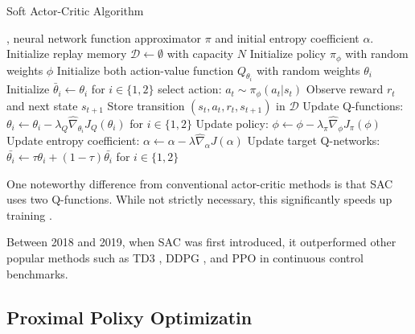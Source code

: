 \begin{algorithm}[H]
\caption{Soft Actor-Critic Algorithm}
\label{alg:SAC}
\begin{algorithmic}[1]
, neural network function approximator $\pi$ and initial entropy coefficient $\alpha$.
\State Initialize replay memory $\mathcal{D} \leftarrow \emptyset$ with capacity $N$
\State Initialize policy $\pi_{\phi}$ with random weights $\phi$
\State Initialize both action-value function $Q_{\theta_i}$ with random weights 
$\theta_i$
\State Initialize $\bar{\theta}_{i} \leftarrow \theta_{i}$ for $i \in \{1,2\}$
\Repeat
        \State select action: $a_{t} \sim \pi_{\phi}(a_{t} | s_{t})$
        \State Observe reward $r_{t}$ and next state $s_{t+1}$
        \State Store transition $(s_{t}, a_{t}, r_{t}, s_{t+1})$ in $\mathcal{D}$
    \EndFor
        \State Update Q-functions: $\theta_{i} \gets \theta_{i} - \lambda_{Q} \hat{\nabla}_{\theta_{i}} J_{Q}(\theta_{i})$ for $i \in \{1,2\}$
        \State Update policy: $\phi \gets \phi - \lambda_{\pi} \hat{\nabla}_{\phi} J_{\pi}(\phi)$
        \State Update entropy coefficient: $\alpha \gets \alpha - \lambda \hat{\nabla}_{\alpha} J(\alpha)$
        \State Update target Q-networks: $\bar{\theta_{i}} \gets \tau\theta_{i} + (1 - \tau) \bar{\theta_{i}}$ for $i \in \{1,2\}$
    \EndFor
{}

\end{algorithmic}
\end{algorithm}

One noteworthy difference from conventional actor-critic methods is that SAC uses two Q-functions. While not strictly necessary, this significantly speeds up training \cite{haarnojaSoftActorCriticAlgorithms2019}.

Between 2018 and 2019, when SAC was first introduced, it outperformed other popular methods such as TD3 \cite{fujimotoAddressingFunctionApproximation2018}, DDPG \cite{lillicrapContinuousControlDeep2019}, and PPO \cite{schulmanProximalPolicyOptimization2017} in continuous control benchmarks.

\subsection{Proximal Polixy Optimizatin}\label{subsec:PPO}

